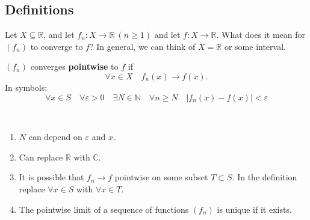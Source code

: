 \documentclass[a4paper]{article}
\begin{document}
\subsection{Definitions}

Let $X \subseteq \mathbb{R}$, and let $ f_n:X\to \mathbb{R}\ (n\ge 1) $ and let $f:X\to \mathbb{R}$. What does it mean for $ (f_n) $ to converge to $f$? In general, we can think of $X=\mathbb{R}$ or some interval. 

\begin{definition}
    $ (f_n) $ converges \textbf{pointwise} to $f$ if 
    \[
       \forall x\in X\quad f_n(x)\to f(x). 
    \]
    In symbols:
    \[
    \forall x \in S \quad \forall \varepsilon>0 \quad \exists N \in \mathbb{N} \quad \forall n \geqslant N \quad\left|f_{n}(x)-f(x)\right|<\varepsilon
    \]
\end{definition}
\begin{remark}\
    \begin{enumerate}
        \item  $N$ can depend on $\varepsilon$ and $x$.
        \item Can replace $\mathbb{R}$ with $\mathbb{C}$.
        \item It is possible that $f_{n} \rightarrow f$ pointwise on some subset $T \subset S$. In the definition replace $\forall x \in S$ with $\forall x \in T$.
        \item The pointwise limit of a sequence of functions $(f_n)$ is unique if it exists.
    \end{enumerate}
\end{remark}
\end{document}

